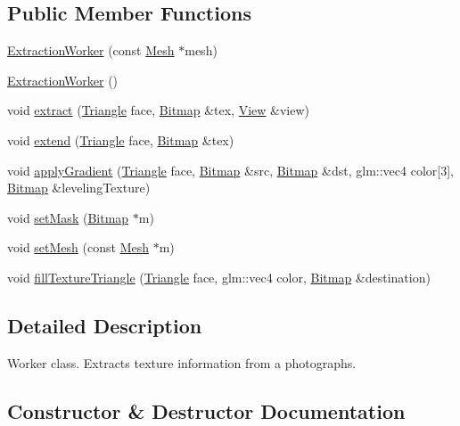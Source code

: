 \subsection*{Public Member Functions}
\begin{DoxyCompactItemize}
\item 
\hyperlink{class_extraction_worker_a5cb5231da6a9c3568c1cbdeaa90a30e2}{Extraction\+Worker} (const \hyperlink{class_mesh}{Mesh} $\ast$mesh)
\item 
\hyperlink{class_extraction_worker_a8b90362238d796129d5d41228a0b0a6e}{Extraction\+Worker} ()
\item 
void \hyperlink{class_extraction_worker_ad649a3ebbc506e55d5b003381b07ba06}{extract} (\hyperlink{struct_triangle}{Triangle} face, \hyperlink{class_bitmap}{Bitmap} \&tex, \hyperlink{class_view}{View} \&view)
\item 
void \hyperlink{class_extraction_worker_a24312158a7768088b96dd722414786ae}{extend} (\hyperlink{struct_triangle}{Triangle} face, \hyperlink{class_bitmap}{Bitmap} \&tex)
\item 
void \hyperlink{class_extraction_worker_ac956797cff498d82f040d3884be2144d}{apply\+Gradient} (\hyperlink{struct_triangle}{Triangle} face, \hyperlink{class_bitmap}{Bitmap} \&src, \hyperlink{class_bitmap}{Bitmap} \&dst, glm\+::vec4 color\mbox{[}3\mbox{]}, \hyperlink{class_bitmap}{Bitmap} \&leveling\+Texture)
\item 
void \hyperlink{class_extraction_worker_a3ae8fdacd8e2a0b44873c36b6e3756e5}{set\+Mask} (\hyperlink{class_bitmap}{Bitmap} $\ast$m)
\item 
void \hyperlink{class_extraction_worker_a0bfb06fd0caed6ec032416e8d928fbe8}{set\+Mesh} (const \hyperlink{class_mesh}{Mesh} $\ast$m)
\item 
void \hyperlink{class_extraction_worker_a25d7438c2adfc4e4e4076954516a4f43}{fill\+Texture\+Triangle} (\hyperlink{struct_triangle}{Triangle} face, glm\+::vec4 color, \hyperlink{class_bitmap}{Bitmap} \&destination)
\end{DoxyCompactItemize}


\subsection{Detailed Description}
Worker class. Extracts texture information from a photographs. 

\subsection{Constructor \& Destructor Documentation}
\hypertarget{class_extraction_worker_a5cb5231da6a9c3568c1cbdeaa90a30e2}{}
